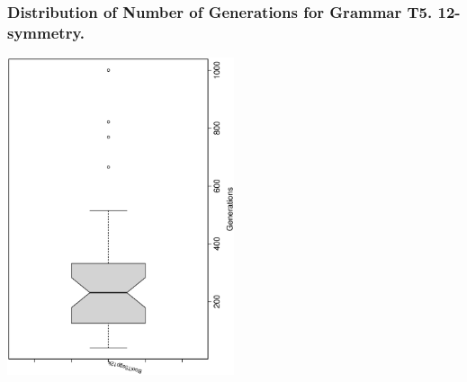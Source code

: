  \begin{frame}
 \frametitle{ Distribution of Number of Generations for Grammar T5. 12-symmetry. }
 \begin{center}
\includegraphics[width=0.5\textwidth, angle=-90]
{ExpFboxplottGenerations010.eps}
 \end{center}
 \label{ExpFboxplottGenerations010.eps}  
 \end{frame}

